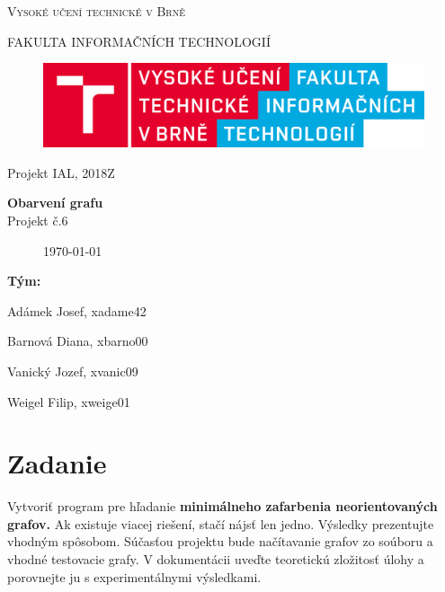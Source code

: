 \documentclass[a4paper,11pt]{article}
\begin{document}

\begin{titlepage}
\begin{center}
    {\Huge \textsc{Vysoké učení technické v Brně}}
    
    {\LARGE \uppercase{FAKULTA INFORMAČNÍCH TECHNOLOGIÍ}}
    
\begin{figure}[h]
\vspace{5.0cm}
\centering
\includegraphics[scale=0.15]{logo.png}
\vspace{-10.0cm}
\end{figure}
    
	{\LARGE Projekt IAL, 2018Z}

	{\Huge \textbf{Obarvení grafu}}
\\

{\LARGE {Projekt č.6}}\\

\begin{figure}[h]
\centering
{\Large {\mydate\today}}
\vspace{6cm}
\end{figure}

\end{center}
\begin{compactitem}
\item[] \textbf{Tým:}
\item[] Adámek Josef, xadame42
\item[] Barnová Diana, xbarno00
\item[] Vanický Jozef, xvanic09
\item[] Weigel Filip, xweige01
\end{compactitem}

\end{titlepage}

\tableofcontents
\newpage

\section{Zadanie}
Vytvoriť program pre hľadanie \textbf{minimálneho zafarbenia neorientovaných grafov.} 
Ak existuje viacej riešení, stačí nájsť len jedno. Výsledky prezentujte vhodným spôsobom. Súčasťou projektu bude načítavanie grafov zo soúboru a vhodné testovacie grafy. V dokumentácii uveďte teoretickú zložitosť úlohy a porovnejte ju s experimentálnymi výsledkami.
\end{document}
